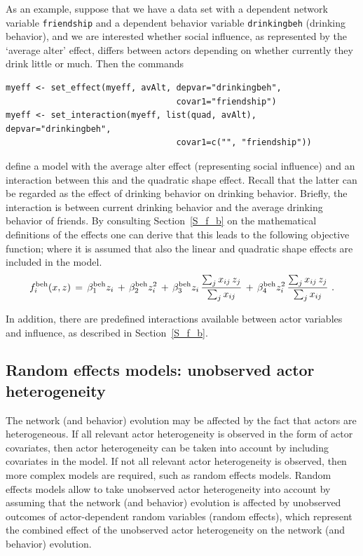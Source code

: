 \documentclass[a4paper,fleqn,11pt]{article}
\newcommand{\+}{\, + \,}
\begin{document}
As an example, suppose that we have a data set with a dependent
network variable \texttt{friendship} and a dependent behavior variable
\texttt{drinkingbeh} (drinking behavior), and we are interested whether
social influence, as represented by the `average alter' effect, differs
between actors depending on whether currently they drink little or much.
Then the commands
\begin{verbatim}
myeff <- set_effect(myeff, avAlt, depvar="drinkingbeh",
                                  covar1="friendship")
myeff <- set_interaction(myeff, list(quad, avAlt), depvar="drinkingbeh",
                                  covar1=c("", "friendship"))
\end{verbatim}
define a model with the average alter effect (representing social influence)
and an interaction between this and the quadratic shape effect.
Recall that the latter can be regarded
as the effect of drinking behavior on drinking behavior.
Briefly, the interaction is between current drinking behavior
and the average drinking behavior of friends.
By consulting Section~\ref{S_f_b} on the mathematical definitions of the
effects one can derive that this leads to the following objective function;
where it is assumed that also the linear and quadratic shape effects are
included in the model.
\[
f^{\rm beh}_i(x, z) \,=\, \beta^{\rm beh}_1 z_i \,+\, \beta^{\rm beh}_2 z_i^2
        \,+\, \beta^{\rm beh}_3 z_i \,
        \frac{ \sum_j x_{ij}\, z_j }{\sum_j x_{ij}}
       \,+\, \beta^{\rm beh}_4 z_i^2 \,
              \frac{ \sum_j x_{ij}\, z_j }{\sum_j x_{ij}} \ .
\]
\medskip

In addition, there are predefined interactions available
between actor variables and influence, as described in Section~\ref{S_f_b}.

\iffalse
\subsection{Random effects models: unobserved actor heterogeneity}

The network (and behavior) evolution may be affected
by the fact that actors are heterogeneous.
If all relevant actor heterogeneity is observed in the form of actor
covariates,
then actor heterogeneity can be taken into account by including
covariates in the model.
If not all relevant actor heterogeneity is observed,
then more complex models are required, such as random effects models.
Random effects models \citep[see][]{SchweinbergerSnijders07b} allow to take
unobserved actor heterogeneity into account
by assuming that the network (and behavior) evolution is affected
by unobserved
outcomes of actor-dependent random variables (random effects),
which represent the combined effect of the unobserved actor
heterogeneity on the network (and behavior) evolution.
\end{document}
